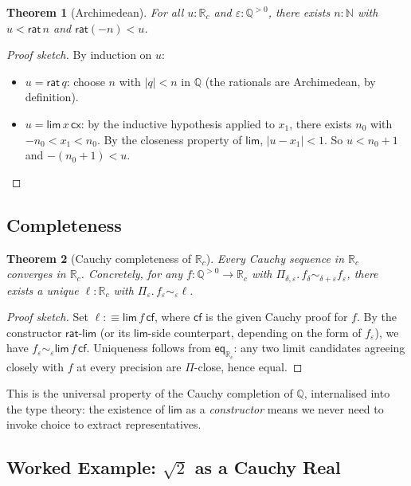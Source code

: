 \documentclass[12pt]{article}
\newtheorem{theorem}{Theorem}[section]
\theoremstyle{definition}
\theoremstyle{remark}
\newcommand{\N}{\mathbb{N}}
\newcommand{\Q}{\mathbb{Q}}
\newcommand{\Rc}{\mathbb{R}_{c}}
\newcommand{\rat}{\mathsf{rat}}
\newcommand{\hlim}{\mathsf{lim}}
\newcommand{\close}{\mathrel{\sim}}
\begin{document}
\begin{theorem}[Archimedean]
\label{thm:archimedean}
For all $u : \Rc$ and $\varepsilon : \Q^{>0}$, there exists $n : \N$ with
$u < \rat\,n$ and $\rat(-n) < u$.
\end{theorem}
\begin{proof}[Proof sketch]
By induction on $u$:
\begin{itemize}
\item $u = \rat\,q$: choose $n$ with $|q| < n$ in $\Q$ (the rationals
are Archimedean, by definition).
\item $u = \hlim\,x\,\mathsf{cx}$: by the inductive hypothesis applied
to $x_1$, there exists $n_0$ with $-n_0 < x_1 < n_0$. By the closeness
property of $\hlim$, $|u - x_1| < 1$. So $u < n_0 + 1$ and
$-(n_0 + 1) < u$.
\end{itemize}
\end{proof}

\subsection{Completeness}

\begin{theorem}[Cauchy completeness of $\Rc$]
\label{thm:complete}
Every Cauchy sequence in $\Rc$ converges in $\Rc$. Concretely, for
any $f : \Q^{>0} \to \Rc$ with
$\Pi_{\delta, \varepsilon}.\, f_\delta \close_{\delta + \varepsilon}
f_\varepsilon$, there exists a unique $\ell : \Rc$ with
$\Pi_\varepsilon.\, f_\varepsilon \close_\varepsilon \ell$.
\end{theorem}
\begin{proof}[Proof sketch]
Set $\ell :\equiv \hlim\,f\,\mathsf{cf}$, where $\mathsf{cf}$ is the
given Cauchy proof for $f$. By the constructor $\mathsf{rat\text{-}lim}$
(or its $\hlim$-side counterpart, depending on the form of
$f_\varepsilon$), we have
$f_\varepsilon \close_\varepsilon \hlim\,f\,\mathsf{cf}$.
Uniqueness follows from $\mathsf{eq}_{\Rc}$: any two limit candidates
agreeing closely with $f$ at every precision are $\Pi$-close, hence
equal.
\end{proof}

This is the universal property of the Cauchy completion of $\Q$,
internalised into the type theory: the existence of $\hlim$ as a
\emph{constructor} means we never need to invoke choice to extract
representatives.

\subsection{Worked Example: $\sqrt{2}$ as a Cauchy Real}
\end{document}
